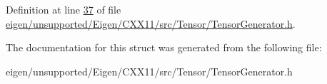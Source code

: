 Definition at line \hyperlink{eigen_2unsupported_2_eigen_2_c_x_x11_2src_2_tensor_2_tensor_generator_8h_source_l00037}{37} of file \hyperlink{eigen_2unsupported_2_eigen_2_c_x_x11_2src_2_tensor_2_tensor_generator_8h_source}{eigen/unsupported/\+Eigen/\+C\+X\+X11/src/\+Tensor/\+Tensor\+Generator.\+h}.



The documentation for this struct was generated from the following file\+:\begin{DoxyCompactItemize}
\item 
eigen/unsupported/\+Eigen/\+C\+X\+X11/src/\+Tensor/\+Tensor\+Generator.\+h\end{DoxyCompactItemize}
